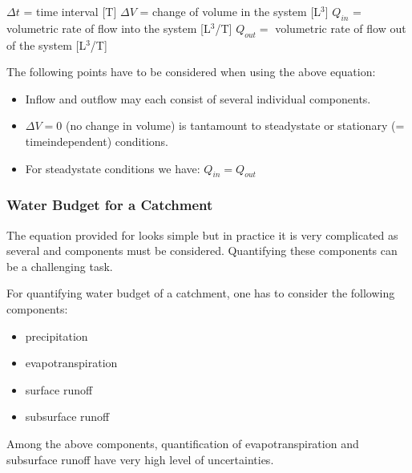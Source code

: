 \documentclass[letterpaper,10pt,english]{sphinxmanual}
\begin{document}
\(\Delta t\) = time interval {[}T{]} 
\(\Delta V\) = change of volume in the system {[}L\(^3\){]} 
\(Q_{in}\) = volumetric rate of flow into the system {[}L\(^3\)/T{]} 
\(Q_{out} =\) volumetric rate of flow out of the system {[}L\(^3\)/T{]} 

The following points have to be considered when using the above equation:
\begin{itemize}
\item {} 
Inflow and outflow may each consist of several individual components. 

\item {} 
\(\Delta V = 0\) (no change in  volume) is tantamount to steady\sphinxhyphen{}state or stationary (= time\sphinxhyphen{}independent) conditions. 

\item {} 
For steady\sphinxhyphen{}state conditions we have: \(Q_{in} = Q_{out}\)

\end{itemize}


\subsubsection{Water Budget for a Catchment}
\label{\detokenize{contents/background/03_basic_hydrogeology:water-budget-for-a-catchment}}
The equation provided for  looks simple but in practice it is very complicated as several  and  components must be considered. Quantifying these components can be a challenging task.

For quantifying water budget of a catchment, one has to consider the following components:

\begin{itemize}
\item {} 
precipitation

\item {} 
evapotranspiration

\item {} 
surface runoff

\item {} 
subsurface runoff

\end{itemize}

Among the above components, quantification of evapotranspiration and subsurface runoff have very high level of uncertainties.
\end{document}
